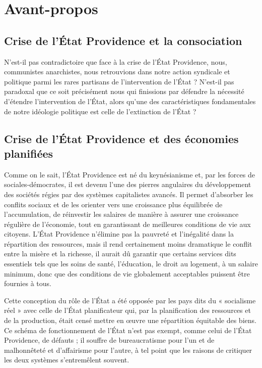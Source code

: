 \chapter*{Avant-propos}

\section*{Crise de l'État Providence et la consociation}

N'est-il pas contradictoire que face à la crise de l'État Providence, nous, communistes anarchistes, nous retrouvions dans notre action syndicale et politique parmi les rares partisans de l'intervention de l'État ? N'est-il pas paradoxal que ce soit précisément nous qui finissions par défendre la nécessité d'étendre l'intervention de l'État, alors qu'une des caractéristiques fondamentales de notre idéologie politique est celle de l'extinction de l'État ?

\section*{Crise de l'État Providence et des économies planifiées}

Comme on le sait, l'État Providence est né du keynésianisme et, par les forces de sociales-démocrates, il est devenu l'une des pierres angulaires du développement des sociétés régies par des systèmes capitalistes avancés. Il permet d'absorber les conflits sociaux et de les orienter vers une croissance plus équilibrée de l'accumulation, de réinvestir les salaires de manière à assurer une croissance régulière de l'économie, tout en garantissant de meilleures conditions de vie aux citoyens. L'État Providence n'élimine pas la pauvreté et l'inégalité dans la répartition des ressources, mais il rend certainement moins dramatique le conflit entre la misère et la richesse, il aurait dû garantir que certains services dits essentiels tels que les soins de santé, l'éducation, le droit au logement, à un salaire minimum, donc que des conditions de vie globalement acceptables puissent être fournies à tous.

Cette conception du rôle de l'État a été opposée par les pays dits du « socialisme réel » avec  celle de l’État planificateur qui, par la planification des ressources et de la production, était censé mettre en œuvre une répartition équitable des biens. Ce schéma de fonctionnement de l'État n'est pas exempt, comme celui de l'État Providence, de défauts ; il souffre de bureaucratisme pour l'un et de malhonnêteté et d'affairisme pour l'autre, à tel point que les raisons de critiquer les deux systèmes s'entremêlent souvent.

